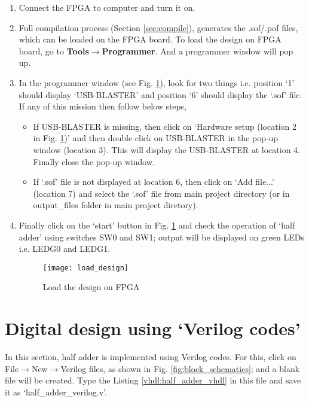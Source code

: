 \begin{enumerate}
	\item Connect the FPGA to computer and turn it on. 
	
	\item Full compilation process (Section \ref{sec:compile}), generates the .sof/.pof files, which can be loaded on the FPGA board. To load the design on FPGA board, go to \textbf{Tools$\rightarrow$Programmer}. And a programmer window will pop up. 
	
	\item In the programmer window (see Fig. \ref{fig:load_design}), look for two things i.e. position `1' should display `USB-BLASTER' and position `6' should display the `.sof' file. If any of this mission then follow below steps, 
	
	\begin{itemize}
		\item If USB-BLASTER is missing, then click on `Hardware setup (location 2 in Fig. \ref{fig:load_design})' and then double click on USB-BLASTER in the pop-up window (location 3). This will display the USB-BLASTER at location 4. Finally close the pop-up window. 
		
		\item If `.sof' file is not displayed at location 6, then click on `Add file...' (location 7) and select the `.sof' file from main project directory (or in output\_files folder in main project diretory).
	\end{itemize} 
	
	\item Finally click on the `start' button in Fig. \ref{fig:load_design} and check the operation of `half adder' using switches SW0 and SW1; output will be displayed on green LEDs i.e. LEDG0 and LEDG1. 
	
	\begin{figure}[!h]
		\centering
		\texttt{[image: load\_design]}
		\caption{Load the design on FPGA}
		\label{fig:load_design}
	\end{figure}
\end{enumerate}

\section{Digital design using `Verilog codes'} \label{sec:digital_des_with_vhdl}

In this section, half adder is implemented using Verilog codes. For this, click on File$\rightarrow$New$\rightarrow$Verilog files, as shown in Fig. \ref{fig:block_schematics}; and a blank file will be created. Type the Listing \ref{vhdl:half_adder_vhdl} in this file and save it as `half\_adder\_verilog.v'. 

